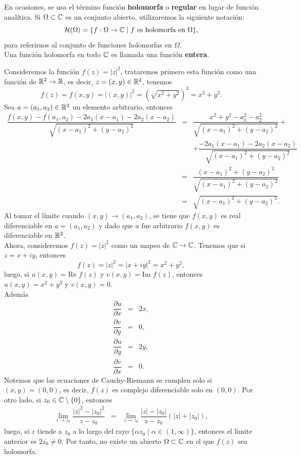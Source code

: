 En ocasiones, se usa el término función \textbf{holomorfa} o \textbf{regular} en lugar de función analítica. Si  $\Omega\subset \mathbb{C}$ es un conjunto abierto, utilizaremos la siguiente notación:
$$\mathcal{H}(\Omega)=\{f:\Omega\rightarrow \mathbb{C} \mid f \mbox{ es holomorfa en } \Omega\},$$
para referirnos al conjunto de funciones holomorfas en $\Omega$.\\
Una función holomorfa en todo $\mathbb{C}$   es llamada una función \textbf{entera}.
\begin{Ejem}
	Consideremos la función $f(z)=|z|^{2}$, trataremos primero esta función como una función de $\mathbb{R}^2\rightarrow\mathbb{R}$, es decir, $z=(x,y)\in\mathbb{R}^2$, tenemos 
	$$f(z)=f(x,y)=|(x,y)|^2=\left(\sqrt{x^{2}+y^{2}}\right)^2=x^2+y^2.$$
	Sea $a=(a_1,a_2)\in\mathbb{R}^2$ un elemento arbitrario, entonces 
	\[
	\begin{array}{ccl}
		\dfrac{f(x,y)-f(a_1,a_2)-2a_1(x-a_1)-2a_2(x-a_2)}{\sqrt{(x-a_1)^2+(y-a_2)^2}}&=&\dfrac{x^2+y^2-a_1^2-a_2^2}{\sqrt{(x-a_1)^2+(y-a_2)^2}}+\\
		&&+\dfrac{-2a_1(x-a_1)-2a_2(x-a_2)}{\sqrt{(x-a_1)^2+(y-a_2)^2}}\\
		&=&\dfrac{(x-a_1)^2+(y-a_2)^2}{\sqrt{(x-a_1)^2+(y-a_2)^2}}\\
		&=&\sqrt{(x-a_1)^2+(y-a_2)^2}.
	\end{array}
	\]
	Al tomar el límite cuando $(x,y)\rightarrow(a_1,a_2)$, se tiene que $f(x,y)$ es real diferenciable en $a=(a_1,a_2)$ y dado que $a$ fue arbitrario $f(x,y)$ es diferenciable en $\mathbb{R}^2$.\\
	Ahora, consideremos  $f(z)=|z|^{2}$ como un mapeo de $\mathbb{C}\rightarrow\mathbb{C}$.
	Tenemos que si $z=x+iy$, entonces 
	$$f(z)=|z|^2=|x+iy|^2=x^2+y^2,$$
	luego, si $u(x,y)=\mbox{Re }f(z)$ y $v(x,y)=\mbox{Im }f(z)$, entonces $u(x,y)=x^2+y^2$ y $v(x,y)=0$.\\ 
	Además
	\[
	\begin{array}{ccl}
		\dfrac{\partial u}{\partial x}&=&2x,\\
		\dfrac{\partial v}{\partial y}&=&0,\\
		\dfrac{\partial u}{\partial y}&=&2y,\\
		\dfrac{\partial v}{\partial x}&=&0.
	\end{array}
	\]
	Notemos que las ecuaciones de Cauchy-Riemann se cumplen solo si $(x,y)=(0,0)$, es decir, $f(z)$ es complejo diferenciable solo en $(0,0)$. Por otro lado, si $z_0\in \mathbb{C}\setminus\{0\}$, entonces 
	\[
	\begin{array}{ccl}
		\displaystyle	\lim_{z\rightarrow z_0}\dfrac{|z|^2-|z_0|^2}{z-z_0}&=&\displaystyle\lim_{z\rightarrow z_0}\dfrac{|z|-|z_0|}{z-z_0}(|z|+|z_0|),
	\end{array}
	\]
	luego, si $z$ tiende a $z_0$ a lo largo del rayo $\{\alpha z_0\mid \alpha\in (1,\infty)\}$, entonces 
	el límite anterior es $2\overline{z_0}\neq 0$. Por tanto, no existe un abierto $\Omega\subset \mathbb{C}$ en el que $f(z)$ sea holomorfa.\endproof
\end{Ejem}
